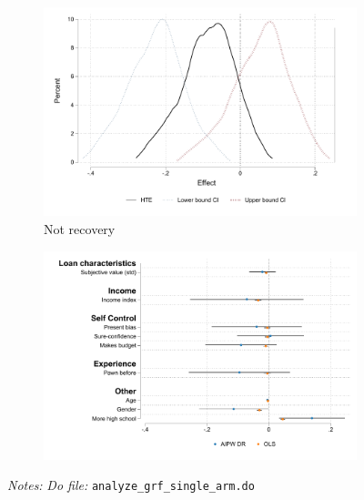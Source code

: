 \documentclass[11pt]{article}
\begin{document}
\begin{figure}[H]
\begin{center}
    \begin{subfigure}{0.4\textwidth}
        \caption{Not recovery}
        \centering
        \includegraphics[width=\textwidth]{Figuras/he_dist_def_c_pro_2.pdf}
    \end{subfigure}
    \begin{subfigure}{0.4\textwidth}
        \caption*{}
        \centering
        \includegraphics[width=\textwidth]{Figuras/HE/he_int_vertical_def_c_pro_2.pdf}
    \end{subfigure}
    \end{center}
     \footnotesize \textit{Notes: } 
      \footnotesize{ \textit{Do file: }  \texttt{analyze\_grf\_single\_arm.do}}
\end{figure}
\end{document}
